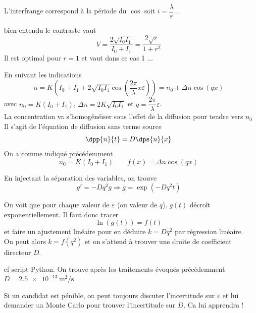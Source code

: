 \documentclass[a4paper,twoside,11pt]{article}
\begin{document}
\qt L'interfrange correspond à la période du $\cos$ soit $\boxed{i=\dfrac{\lambda}{\varepsilon}}$... 


\qt  bien entendu le contraste vaut 
$$
V=\dfrac{2\sqrt{I_0I_1}}{I_0+I_1}=\dfrac{2\sqrt{r}}{1+r^2}
$$
Il est optimal pour $r=1$ et vaut dans ce cas 1 ...

\qt En suivant les indications
$$
n=K(I_0+I_1+2\sqrt{I_0I_1}\cos\left( \dfrac{2\pi }{\lambda}x\varepsilon\right) )=n_0+\Delta n\cos\left(qx\right) 
$$
avec $n_0=K(I_0+I_1)$, $\Delta n=2K\sqrt{I_0I_1}$ et $q= \dfrac{2\pi }{\lambda}\varepsilon$.\\
La concentration va s'homogénéiser sous l'effet de la diffusion pour tendre vers $n_0$
\qt Il s'agit de l'équation de diffusion sans terme source 
$$
\dpp{n}{t}=D\dps{n}{x}
$$
\qt On a comme indiqué précédemment 
$$
n_0=K(I_0+I_1)\quad \quad f(x)=\Delta n\cos(qx)
$$

En injectant la séparation des variables, on trouve 
$$
g'=-Dq^2g\Rightarrow g=\exp(-Dq^2t)
$$



\qt On voit que pour chaque valeur de $\varepsilon$ (ou valeur de $q$), $g(t)$ décroît exponentiellement. Il faut donc tracer 
$$
\ln(g(t))=f(t)
$$
et faire un ajustement linéaire pour en déduire $k=Dq^2$ par régression linéaire. \\
On peut alors $k=f(q^2)$ et on s'attend à trouver une droite de coefficient directeur $D$.

\qt cf script Python. On trouve après les traitements évoqués précédemment $D=\SI{2.5e-13}{\m\squared\per\s}$

Si un candidat est pénible, on peut toujours discuter l'incertitude sur $\varepsilon$ et lui demander un Monte Carlo pour trouver l'incertitude sur $D$. Ca lui apprendra !
\end{document}
